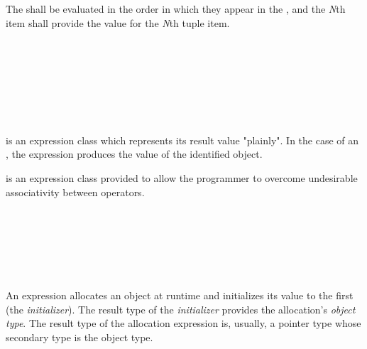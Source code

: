 \specsubsubitem
The  shall be evaluated in the order in which they
appear in the , and the \textit{N}th item shall
provide the value for the \textit{N}th tuple item.


\begin{grammar}
 \\
	 \\
	 \\

 \\
	 \\
	\terminal{(}  \terminal{)} \\
\end{grammar}

\specsubsubitem
{} is an expression class which represents its
result value "plainly". In the case of an , the
expression produces the value of the identified object.

\specsubsubitem
{} is an expression class provided to allow the
programmer to overcome undesirable associativity between operators.


\begin{grammar}
 \\
	 \terminal{(}  \terminal{)} \\
	 \terminal{(}   \terminal{)} \\
	 \terminal{(}  \terminal{,}  \terminal{)} \\
	 \terminal{(}  \terminal{)} \\
\end{grammar}

\specsubsubitem
An  expression allocates an object at runtime and initializes
its value to the first  (the \textit{initializer}). The
result type of the \textit{initializer} provides the allocation's
\textit{object type}. The result type of the allocation expression is, usually,
a pointer type whose secondary type is the object type.

